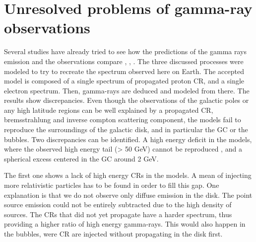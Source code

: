 \newpage
\section{Unresolved problems of gamma-ray observations}


%
%
%

Several studies have already tried to see how the predictions of the gamma rays emission and the observations compare \cite{Calore2015}, \cite{Fermi2017}, \cite{Yang2016}. The three discussed processes were modeled to try to recreate the spectrum observed here on Earth. The accepted model is composed of a single spectrum of propagated proton CR, and a single electron spectrum. Then, gamma-rays are deduced and modeled from there. The results show discrepancies.
Even though the observations of the galactic poles or any high latitude regions can be well explained by a propagated CR, bremsstrahlung and inverse compton scattering component, the models fail to reproduce the surroundings of the galactic disk, and in particular the GC or the bubbles. 
Two discrepancies can be identified. A high energy deficit in the models, where the observed high energy tail (> 50 GeV) cannot be reproduced \cite{Yang2016}, and a spherical excess centered in the GC around 2 GeV.

The first one shows a lack of high energy CRs in the models. A mean of injecting more relativistic particles has to be found in order to fill this gap. One explanation is that we do not observe only diffuse emission in the disk. The point source emission could not be entirely subtracted due to the high density of sources. The CRs that did not yet propagate have a harder spectrum, thus providing a higher ratio of high energy gamma-rays. This would also happen in the bubbles, were CR are injected without propagating in the disk first.

